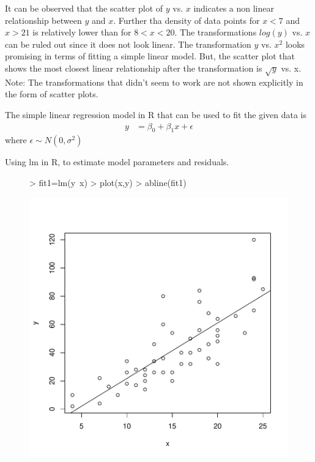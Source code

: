 \documentclass[12pt]{article}
\begin{document}
\begin{itemize}
\begin{figure}[H]
\end{figure}

\begin{figure}[H]
\end{figure}
\end{itemize}
It can be observed that the scatter plot of $y$ vs. $x$ indicates a non linear relationship between $y$ and $x$. Further tha density of data points for $x<7$ and $x>21$ is relatively lower than for $8<x<20$. The transformations $log(y)$ vs. $x$ can be ruled out since it does not look linear. The transformation $y$ vs. $x^2$ looks promising in terms of fitting a simple linear model. But, the scatter plot that shows the most closest linear relationship after the transformation is $\sqrt{y}$ vs. x. Note: The transformations that didn't seem to work are not shown explicitly in the form of  scatter plots.
\item
The simple linear regression model in R that can be used to fit the given data is 
\begin{equation*}
\begin{aligned}
y &= \beta_0 + \beta_1 x + \epsilon
\end{aligned}
\end{equation*}
where $\epsilon \sim N(0,\sigma^2)$

\item Using lm in R, to estimate model parameters and residuals.
\begin{figure}[H]
\begin{Schunk}
\begin{Sinput}
> fit1=lm(y~x)
> plot(x,y)
> abline(fit1)
\end{Sinput}
\end{Schunk}
\includegraphics{HW3-005}
\end{figure}
\end{document}
